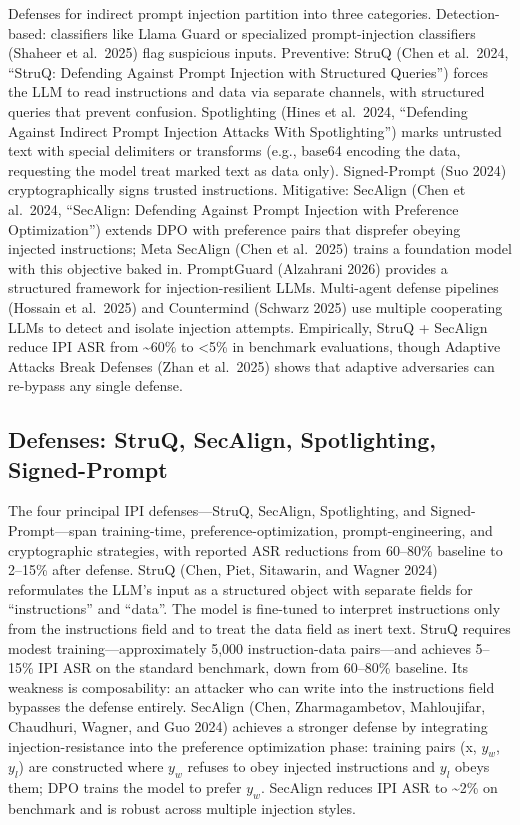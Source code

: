 Defenses for indirect prompt injection partition into three categories. Detection-based: classifiers like Llama Guard or specialized prompt-injection classifiers (Shaheer et al.~2025) flag suspicious inputs. Preventive: StruQ (Chen et al.~2024, ``StruQ: Defending Against Prompt Injection with Structured Queries'') forces the LLM to read instructions and data via separate channels, with structured queries that prevent confusion. Spotlighting (Hines et al.~2024, ``Defending Against Indirect Prompt Injection Attacks With Spotlighting'') marks untrusted text with special delimiters or transforms (e.g., base64 encoding the data, requesting the model treat marked text as data only). Signed-Prompt (Suo 2024) cryptographically signs trusted instructions. Mitigative: SecAlign (Chen et al.~2024, ``SecAlign: Defending Against Prompt Injection with Preference Optimization'') extends DPO with preference pairs that disprefer obeying injected instructions; Meta SecAlign (Chen et al.~2025) trains a foundation model with this objective baked in. PromptGuard (Alzahrani 2026) provides a structured framework for injection-resilient LLMs. Multi-agent defense pipelines (Hossain et al.~2025) and Countermind (Schwarz 2025) use multiple cooperating LLMs to detect and isolate injection attempts. Empirically, StruQ + SecAlign reduce IPI ASR from \textasciitilde60\% to \textless5\% in benchmark evaluations, though Adaptive Attacks Break Defenses (Zhan et al.~2025) shows that adaptive adversaries can re-bypass any single defense.

\subsection{Defenses: StruQ, SecAlign, Spotlighting, Signed-Prompt}\label{defenses-struq-secalign-spotlighting-signed-prompt}

The four principal IPI defenses---StruQ, SecAlign, Spotlighting, and Signed-Prompt---span training-time, preference-optimization, prompt-engineering, and cryptographic strategies, with reported ASR reductions from 60--80\% baseline to 2--15\% after defense. StruQ (Chen, Piet, Sitawarin, and Wagner 2024) reformulates the LLM's input as a structured object with separate fields for ``instructions'' and ``data''. The model is fine-tuned to interpret instructions only from the instructions field and to treat the data field as inert text. StruQ requires modest training---approximately 5,000 instruction-data pairs---and achieves 5--15\% IPI ASR on the standard benchmark, down from 60--80\% baseline. Its weakness is composability: an attacker who can write into the instructions field bypasses the defense entirely. SecAlign (Chen, Zharmagambetov, Mahloujifar, Chaudhuri, Wagner, and Guo 2024) achieves a stronger defense by integrating injection-resistance into the preference optimization phase: training pairs (x, \(y_w\), \(y_l\)) are constructed where \(y_w\) refuses to obey injected instructions and \(y_l\) obeys them; DPO trains the model to prefer \(y_w\). SecAlign reduces IPI ASR to \textasciitilde2\% on benchmark and is robust across multiple injection styles.

